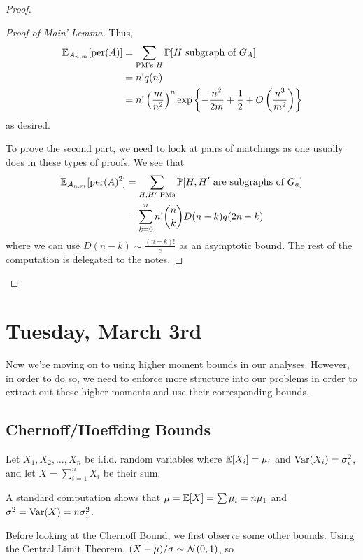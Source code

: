 \documentclass[11 pt]{scrartcl}
\newcommand{\per}{\text{per}}
\begin{document}
\begin{proof}
\begin{proof}[Proof of Main' Lemma]
        Thus, 
        \begin{align*}
            \EE_{\Acal_{n,m}}[\per(A)] &= \sum_{\text{PM's }H} \PP[H\text{ subgraph of }G_A] \\ 
                                       &= n! q(n) \\ 
                                       &= n!\left(\dfrac{m}{n^2}\right)^n \exp\left\{-\dfrac{n^2}{2m} + \dfrac{1}{2} + O \left( \dfrac{n^3}{m^2}\right) \right\}
        \end{align*}
        as desired.

        To prove the second part, we need to look at pairs of matchings as one usually does in these types of proofs. We see that 
        \begin{align*}
            \EE_{\Acal_{n,m}}[\per(A)^2] &= \sum_{H, H'\text{ PMs}} \PP[H, H'\text{ are subgraphs of }G_a] \\ 
                                         &= \sum_{k=0}^n n! \binom{n}{k} D(n-k) q(2n-k)
        \end{align*}
        where we can use $D(n-k) \sim \frac{(n-k)!}{e}$ as an asymptotic bound. The rest of the computation is delegated to the notes. 
    \end{proof}
\end{proof}

\newpage
\section{Tuesday, March 3rd}
Now we're moving on to using higher moment bounds in our analyses. However, in order to do so, we need to enforce more structure into our problems in order to extract out these higher moments and use their corresponding bounds. 

\subsection{Chernoff/Hoeffding Bounds}

Let $X_1, X_2, \dots, X_n$ be i.i.d. random variables where $\mathbb E[X_i] = \mu_i$ and $\text{Var}(X_i) = \sigma_i^2$, and let $X = \sum_{i=1}^n X_i$ be their sum. 

A standard computation shows that $\mu = \mathbb E[X] = \sum \mu_i = n\mu_1$ and $\sigma^2 = \text{Var}(X) = n\sigma_1^2$. 

Before looking at the Chernoff Bound, we first observe some other bounds. Using the Central Limit Theorem, $(X-\mu)/\sigma \sim \mathcal{N}(0,1)$, so 
\end{document}
